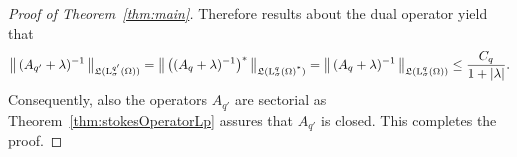 \begin{proof}[Proof of Theorem~\ref{thm:main}]
  Therefore results about the dual operator yield that
  \begin{align*}
    \big\| \, (A_{q'} + \lambda)^{-1} \, \big\|_{\Li(\Ell^{q'}_\sigma(\Omega))}
    = \big\|\, \big(( A_q + \lambda)^{-1}\big)^* \, \big\|_{\vphantom{\Li(\Ell^{q'}_\sigma(\Omega))}\Li(\Ell^{q}_\sigma(\Omega)^{\stackrel{*}{\phantom{ }}})}
    = \big\| \, (A_q + \lambda)^{-1} \, \big\|_{\vphantom{\Li(\Ell^{q'}_\sigma(\Omega))} \Li(\Ell^q_\sigma(\Omega))}
    \leq \frac{C_q}{1 + |\lambda|}.
  \end{align*}
  Consequently, also the operators $A_{q'}$ are sectorial as Theorem~\ref{thm:stokesOperatorLp} assures that $A_{q'}$ is closed.
  This completes the proof.
\end{proof}
